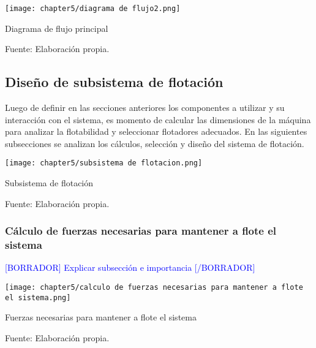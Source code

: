 \begin{myfigure}[H]
	\footnotesize\centering
	\texttt{[image: chapter5/diagrama de flujo2.png]}
	\caption{Diagrama de flujo principal}
	\begin{myflushcenter}
		Fuente: Elaboración propia.
	\end{myflushcenter}
	\label{fig:diagrama de flujo2}
\end{myfigure}


\subsection{Diseño de subsistema de flotación}
\label{ssec:diseno de subsistema de flotacion}

Luego de definir en las secciones anteriores los componentes a utilizar y su interacción con el sistema, es momento de calcular las dimensiones de la máquina para analizar la flotabilidad y seleccionar flotadores adecuados. En las siguientes subsecciones se analizan los cálculos, selección y diseño del sistema de flotación.

\begin{myfigure}[H]
	\footnotesize\centering
	\texttt{[image: chapter5/subsistema de flotacion.png]}
	\caption{Subsistema de flotación}
	\begin{myflushcenter}
		Fuente: Elaboración propia.
	\end{myflushcenter}
	\label{fig:subsistema de flotacion}
\end{myfigure}

\subsubsection{Cálculo de fuerzas necesarias para mantener a flote el sistema}

\textcolor{blue}{[BORRADOR] Explicar subsección e importancia [/BORRADOR]} 

\begin{myfigure}[H]
	\footnotesize\centering
	\texttt{[image: chapter5/calculo de fuerzas necesarias para mantener a flote el sistema.png]}
	\caption{Fuerzas necesarias para mantener a flote el sistema}
	\begin{myflushcenter}
		Fuente: Elaboración propia.
	\end{myflushcenter}
	\label{fig:calculo de fuerzas necesarias para mantener a flote el sistema}
\end{myfigure}

